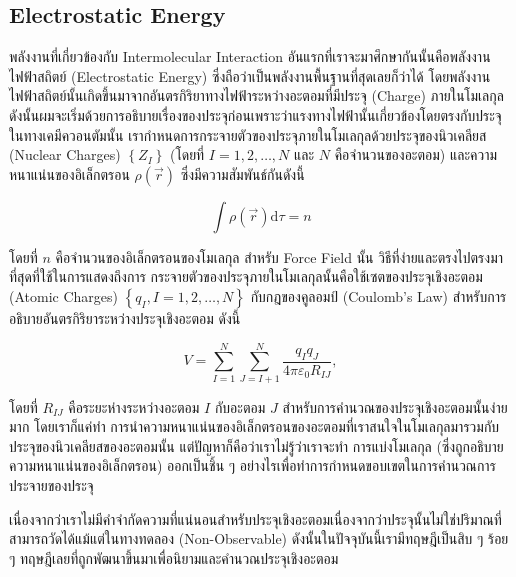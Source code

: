 \subsection{Electrostatic Energy}

พลังงานที่เกี่ยวข้องกับ Intermolecular Interaction อันแรกที่เราจะมาศึกษากันนั้นคือพลังงานไฟฟ้าสถิตย์ (Electrostatic Energy)
ซึ่งถือว่าเป็นพลังงานพื้นฐานที่สุดเลยก็ว่าได้ โดยพลังงานไฟฟ้าสถิตย์นั้นเกิดขึ้นมาจากอันตรกิริยาทางไฟฟ้าระหว่างอะตอมที่มีประจุ (Charge)
ภายในโมเลกุล ดังนั้นผมจะเริ่มด้วยการอธิบายเรื่องของประจุก่อนเพราะว่าแรงทางไฟฟ้านั้นเกี่ยวข้องโดยตรงกับประจุ ในทางเคมีควอนตัมนั้น
เรากำหนดการกระจายตัวของประจุภายในโมเลกุลด้วยประจุของนิวเคลียส (Nuclear Charges) $\left\{Z_{I}\right\}$
(โดยที่ $I = 1,2, \ldots, N$ และ $N$ คือจำนวนของอะตอม) และความหนาแน่นของอิเล็กตรอน $\rho(\vec{r})$ ซึ่งมีความสัมพันธ์กันดังนี้

\begin{equation}
  \int \rho(\vec{r}) \mathrm{d} \tau
  =
  n
\end{equation}

\noindent โดยที่ $n$ คือจำนวนของอิเล็กตรอนของโมเลกุล สำหรับ Force Field นั้น วิธีที่ง่ายและตรงไปตรงมาที่สุดที่ใช้ในการแสดงถึงการ%
กระจายตัวของประจุภายในโมเลกุลนั้นคือใช้เซตของประจุเชิงอะตอม (Atomic Charges) $\left\{q_I, I=1,2, \ldots, N\right\}$
กับกฎของคูลอมป์ (Coulomb's Law) สำหรับการอธิบายอันตรกิริยาระหว่างประจุเชิงอะตอม ดังนี้

\begin{equation}
  V
  =
  \sum_{I=1}^N \sum_{J=I+1}^N \frac{q_I q_J}{4 \pi \varepsilon_0 R_{I J}},
\end{equation}

\noindent โดยที่ $R_{I J}$ คือระยะห่างระหว่างอะตอม $I$ กับอะตอม $J$ สำหรับการคำนวณของประจุเชิงอะตอมนั้นง่ายมาก โดยเราก็แค่ทำ%
การนำความหนาแน่นของอิเล็กตรอนของอะตอมที่เราสนใจในโมเลกุลมารวมกับประจุของนิวเคลียสของอะตอมนั้น แต่ปัญหาก็คือว่าเราไม่รู้ว่าเราจะทำ%
การแบ่งโมเลกุล (ซึ่งถูกอธิบายความหนาแน่นของอิเล็กตรอน) ออกเป็นชิ้น ๆ อย่างไรเพื่อทำการกำหนดขอบเขตในการคำนวณการประจายของประจุ

เนื่องจากว่าเราไม่มีคำจำกัดความที่แน่นอนสำหรับประจุเชิงอะตอมเนื่องจากว่าประจุนั้นไม่ใช่ปริมาณที่สามารถวัดได้แม้แต่ในทางทดลอง (Non-Observable)
ดังนั้นในปัจจุบันนี้เรามีทฤษฎีเป็นสิบ ๆ ร้อย ๆ ทฤษฎีเลยที่ถูกพัฒนาขึ้นมาเพื่อนิยามและคำนวณประจุเชิงอะตอม

